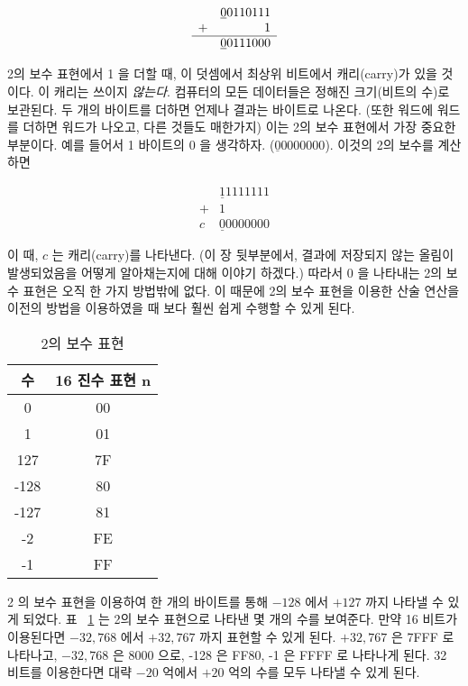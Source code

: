 \[
\begin{array}{rr}
 & \underline{0}0110111 \\
+&                    1 \\ \hline
 & \underline{0}0111000
\end{array}
\]

2의 보수 표현에서 1 을 더할 때, 이 덧셈에서 최상위 비트에서 캐리(carry)가 있을 것이다. 이 캐리는 쓰이지 \emph{않는다}. 컴퓨터의 모든 데이터들은 정해진 
크기(비트의 수)로 보관된다. 두 개의 바이트를 더하면 언제나 결과는 바이트로 나온다. (또한 워드에 워드를 더하면 워드가 나오고, 다른 것들도 매한가지) 
이는 2의 보수 표현에서 가장 중요한 부분이다. 예를 들어서 1 바이트의 0 을 생각하자. ($\underline{0}0000000$). 이것의 2의 보수를 계산하면

\[
\begin{array}{rr}
 & \underline{1}1111111 \\
+&                    1 \\ \hline
c& \underline{0}0000000
\end{array}
\]

이 때, $c$ 는 캐리(carry)를 나타낸다. (이 장 뒷부분에서, 결과에 저장되지 않는 올림이 발생되었음을 어떻게 알아채는지에 대해 이야기 하겠다.)
따라서 0 을 나타내는 2의 보수 표현은 오직 한 가지 방법밖에 없다. 이 때문에 2의 보수 표현을 이용한 산술 연산을 이전의 방법을 이용하였을 때 보다 
훨씬 쉽게 수행할 수 있게 된다. 

\begin{table}
\centering
\begin{tabular}{||c|c||}
\hline
수& 16 진수 표현 n \\
\hline
0 & 00 \\
1 & 01 \\
127 & 7F \\
-128 & 80 \\
-127 & 81 \\
-2 & FE \\
-1 & FF \\
\hline
\end{tabular}
\caption{2의 보수 표현 \label{tab:twocomp}}
\end{table}

2 의 보수 표현을 이용하여 한 개의 바이트를 통해 $-128$ 에서 $+127$ 까지 나타낼 수 있게 되었다. 표 ~\ref{tab:twocomp} 는 2의 보수 표현으로 나타낸
몇 개의 수를 보여준다. 만약 16 비트가 이용된다면 $-32,768$ 에서 $+32,767$ 까지 표현할 수 있게 된다. $+32,767$ 은 7FFF 로 나타나고, $-32,768$ 은 
8000 으로, -128 은 FF80, -1 은 FFFF 로 나타나게 된다. 32 비트를 이용한다면 대략 $-20$ 억에서 $+20$ 억의 수를 모두 나타낼 수 있게 된다. 


